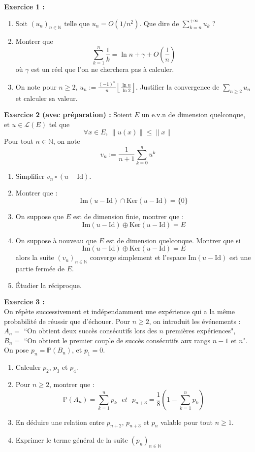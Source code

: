 \documentclass[11pt,a4paper]{article}
\begin{document}
\textbf{Exercice 1 :} 
\begin{enumerate}
\item Soit $(u_n)_{n \in \mathbb{N}}$ telle que $u_n = \displaystyle O(1/n^2)$. Que dire de $\displaystyle \sum_{k=n}^{+\infty} u_k$ ?
\item Montrer que \[\sum_{k=1}^n \frac{1}{k} = \ln{n} + \gamma + O(\frac{1}{n}) \] où $\gamma$ est un réel que l'on ne cherchera pas à calculer. \\
\item On note pour $n \geq 2$,  $u_n := \displaystyle \frac{(-1)^n}{n} \left \lfloor \frac{\ln{n}}{\ln{2}} \right \rfloor $. Justifier la convergence de $\displaystyle \sum_{n \geq 2} u_n$ et calculer sa valeur.\\
\end{enumerate} 


\textbf{Exercice 2 (avec préparation) :} Soient $E$ un e.v.n de dimension quelconque, et $u \in \mathcal{L}(E)$ tel que \[\forall x\in E, \ \| u(x) \| \leq \|x\| \]
Pour tout $n \in \mathbb{N}$, on note \[v_n := \frac{1}{n+1} \sum_{k=0}^n u^k\]
\begin{enumerate}
\item Simplifier $v_n \circ (u - \text{Id})$.
\item Montrer que :  \[\text{Im}(u-\text{Id}) \cap \text{Ker}(u-\text{Id}) = \{0\} \]
\item On suppose que $E$ est de dimension finie, montrer que : \[\text{Im}(u-\text{Id}) \oplus \text{Ker}(u-\text{Id}) = E \]
\item On suppose à nouveau que $E$ est de dimension quelconque. Montrer que si  \[\text{Im}(u-\text{Id}) \oplus \text{Ker}(u-\text{Id}) = E \] alors la suite $(v_n)_{n \in \mathbb{N}}$ converge simplement et l'espace $\text{Im}(u-\text{Id})$ est une partie fermée de $E$.
\item Étudier la réciproque. \\
\end{enumerate}


\textbf{Exercice 3 :} \\
On répète successivement et indépendamment une expérience qui a la même probabilité de réussir que d'échouer. Pour $n \geq 2$, on introduit les événements : \\
$A_n = $ ``On obtient deux succès consécutifs lors des $n$ premières expériences",\\
$B_n = $ ``On obtient le premier couple de succès consécutifs aux rangs $n - 1$ et $n$". \\
On pose $p_n = \mathbb{P}(B_n)$, et $p_1=0$.
\begin{enumerate}
\item Calculer $p_2$, $p_3$ et $p_4$.
\item Pour $n\geq 2$, montrer que : \[\mathbb{P}(A_n) = \sum_{k=1}^n p_k \ \ \ et \ \ \  p_{n+3} = \frac{1}{8}\left ( 1-\sum_{k=1}^n p_k \right ) \]
\item En déduire une relation entre $p_{n+2}$, $p_{n+3}$ et $p_n$ valable pour tout $n \geq 1$.
\item Exprimer le terme général de la suite $(p_n)_{n \in \mathbb{N}}$ \\
\end{enumerate}
\end{document}
